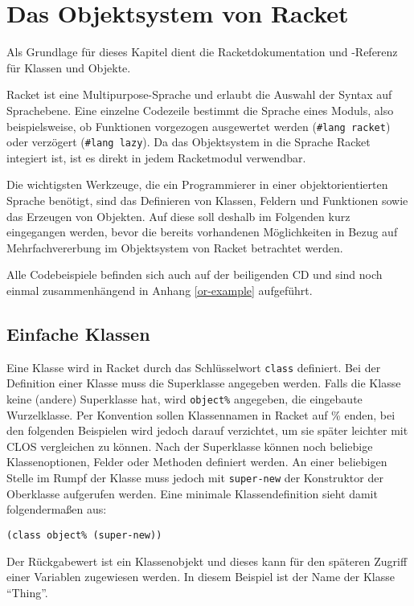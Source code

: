 \section{Das Objektsystem von Racket}
Als Grundlage für dieses Kapitel dient die Racketdokumentation \cite{racketguide-classes} und -Referenz \cite{racketref-classes} für Klassen und Objekte.

Racket ist eine Multipurpose-Sprache und erlaubt die Auswahl der Syntax auf Sprachebene. Eine einzelne Codezeile bestimmt die Sprache eines Moduls, also beispielsweise, ob Funktionen vorgezogen ausgewertet werden (\texttt{\#lang racket}) oder verzögert (\texttt{\#lang lazy}). Da das Objektsystem in die Sprache Racket integiert ist, ist es direkt in jedem Racketmodul verwendbar.

Die wichtigsten Werkzeuge, die ein Programmierer in einer objektorientierten Sprache benötigt, sind das Definieren von Klassen, Feldern und Funktionen sowie das Erzeugen von Objekten. Auf diese soll deshalb im Folgenden kurz eingegangen werden, bevor die bereits vorhandenen Möglichkeiten in Bezug auf Mehrfachvererbung im Objektsystem von Racket betrachtet werden.

Alle Codebeispiele befinden sich auch auf der beiligenden CD und sind noch einmal zusammenhängend in Anhang \ref{or-example} aufgeführt. 

\subsection{Einfache Klassen}

Eine Klasse wird in Racket durch das Schlüsselwort \texttt{class} definiert. Bei der Definition einer Klasse muss die Superklasse angegeben werden. Falls die Klasse keine (andere) Superklasse hat, wird \texttt{object\%} angegeben, die eingebaute Wurzelklasse. Per Konvention sollen Klassennamen in Racket auf \% enden, bei den folgenden Beispielen wird jedoch darauf verzichtet, um sie später leichter mit CLOS vergleichen zu können. Nach der Superklasse können noch beliebige Klassenoptionen, Felder oder Methoden definiert werden. An einer beliebigen Stelle im Rumpf der Klasse muss jedoch mit \texttt{super-new} der Konstruktor der Oberklasse aufgerufen werden. Eine minimale Klassendefinition sieht damit folgendermaßen aus:

\begin{lstlisting}
(class object% (super-new))
\end{lstlisting}

Der Rückgabewert ist ein Klassenobjekt und dieses kann für den späteren Zugriff einer Variablen zugewiesen werden. In diesem Beispiel ist der Name der Klasse ``Thing''.

